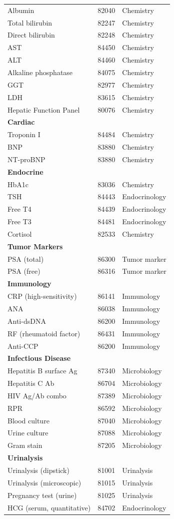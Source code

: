 \begin{longtable}{@{}p{5.5cm}p{2.5cm}p{2.5cm}@{}}
Albumin & 82040 & Chemistry \\
Total bilirubin & 82247 & Chemistry \\
Direct bilirubin & 82248 & Chemistry \\
AST & 84450 & Chemistry \\
ALT & 84460 & Chemistry \\
Alkaline phosphatase & 84075 & Chemistry \\
GGT & 82977 & Chemistry \\
LDH & 83615 & Chemistry \\
Hepatic Function Panel & 80076 & Chemistry \\
\textbf{Cardiac} & & \\
Troponin I & 84484 & Chemistry \\
BNP & 83880 & Chemistry \\
NT-proBNP & 83880 & Chemistry \\
\textbf{Endocrine} & & \\
HbA1c & 83036 & Chemistry \\
TSH & 84443 & Endocrinology \\
Free T4 & 84439 & Endocrinology \\
Free T3 & 84481 & Endocrinology \\
Cortisol & 82533 & Chemistry \\
\textbf{Tumor Markers} & & \\
PSA (total) & 86300 & Tumor marker \\
PSA (free) & 86316 & Tumor marker \\
\textbf{Immunology} & & \\
CRP (high-sensitivity) & 86141 & Immunology \\
ANA & 86038 & Immunology \\
Anti-dsDNA & 86200 & Immunology \\
RF (rheumatoid factor) & 86431 & Immunology \\
Anti-CCP & 86200 & Immunology \\
\textbf{Infectious Disease} & & \\
Hepatitis B surface Ag & 87340 & Microbiology \\
Hepatitis C Ab & 86704 & Microbiology \\
HIV Ag/Ab combo & 87389 & Microbiology \\
RPR & 86592 & Microbiology \\
Blood culture & 87040 & Microbiology \\
Urine culture & 87088 & Microbiology \\
Gram stain & 87205 & Microbiology \\
\textbf{Urinalysis} & & \\
Urinalysis (dipstick) & 81001 & Urinalysis \\
Urinalysis (microscopic) & 81015 & Urinalysis \\
Pregnancy test (urine) & 81025 & Urinalysis \\
HCG (serum, quantitative) & 84702 & Endocrinology \\
\bottomrule
\end{longtable}

